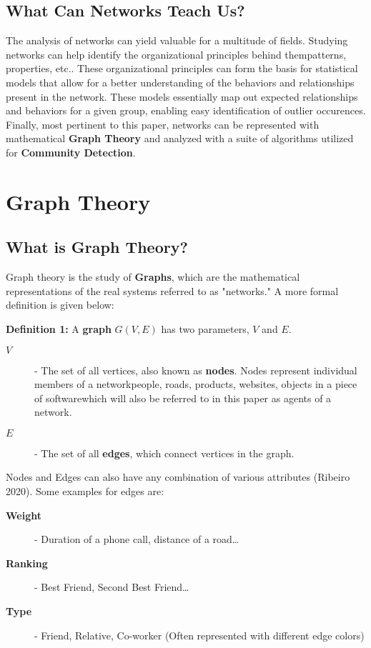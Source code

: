 \documentclass{article}
\begin{document}
\subsection{What Can Networks Teach Us?}
The analysis of networks can yield valuable for a multitude of fields. Studying networks can help identify the organizational principles behind them\textemdash patterns, properties, etc.. These organizational principles can form the basis for statistical models
that allow for a better understanding of the behaviors and relationships present in the network. These models essentially map out expected relationships and behaviors for a given group, enabling easy identification of outlier occurences. Finally, most pertinent to this paper,
networks can be represented with mathematical \textbf{Graph Theory} and analyzed with a suite of algorithms utilized for \textbf{Community Detection}.

\section{Graph Theory}

\subsection{What is Graph Theory?}
Graph theory is the study of \textbf{Graphs}, which are the mathematical representations of the real systems referred to as "networks." A more formal definition is given below:

\bigskip

\noindent \textbf{Definition 1:} A \textbf{graph} $G(V, E)$ has two parameters, $V$ and $E$. 

\indent \begin{description}
  \item[\textbf{$V$}] - The set of all vertices, also known as \textbf{nodes}. Nodes represent individual members of a network\textemdash people, roads, products, websites, objects in a piece of software\textemdash which will also be referred to in this paper as agents of a network.
  \item[\textbf{$E$}] - The set of all \textbf{edges}, which connect vertices in the graph. 
\end{description}

\bigskip

\noindent Nodes and Edges can also have any combination of various attributes (Ribeiro 2020). Some examples for edges are:

\bigskip
\indent \begin{description}
  \item[\textbf{Weight}] - Duration of a phone call, distance of a road\dots
  \item[\textbf{Ranking}] - Best Friend, Second Best Friend\dots
  \item[\textbf{Type}] - Friend, Relative, Co-worker (Often represented with different edge colors)  
\end{description}
\end{document}
